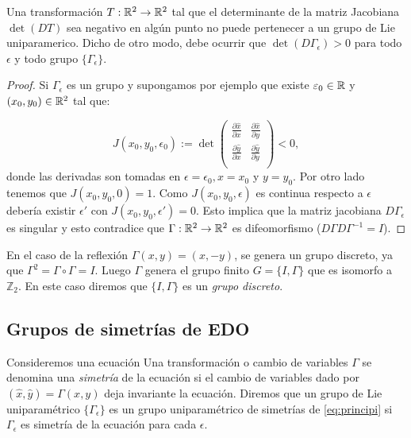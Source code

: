  \begin{teorema}
   Una transformación  $T:\mathbb{R}^2\to\mathbb{R}^2$ tal que el determinante de la matriz Jacobiana $\det(DT)$ sea negativo en algún punto no puede pertenecer a un grupo de Lie uniparamerico. Dicho de otro modo, debe ocurrir que $\det(D\Gamma_{\epsilon})>0$ para todo $\epsilon$ y todo grupo $\{\Gamma_{\epsilon}\}$.
 \end{teorema}
\begin{proof}
 Si $\Gamma_{\epsilon}$ es un grupo y supongamos por ejemplo que existe $\varepsilon_0\in\mathbb{R}$ y $(x_0,y_0)\in\mathbb{R}^2$ tal que:

\[J(x_0,y_0,\epsilon_0):=\det\begin{pmatrix} \frac{\partial\hat{x}}{\partial x}&  \frac{\partial\hat{x}}{\partial y}\\
 \frac{\partial\hat{y}}{\partial x} &  \frac{\partial\hat{y}}{\partial y}\\
\end{pmatrix}<0,
\]
donde las derivadas son tomadas en $\epsilon=\epsilon_0, x=x_0$ y $y=y_0$.
 Por otro lado tenemos que $J(x_0,y_0,0)=1$. Como $J(x_0,y_0,\epsilon)$ es continua respecto a $\epsilon$ debería existir $\epsilon'$ con $J(x_0,y_0,\epsilon')=0$. Esto implica que la matriz jacobiana $D\Gamma_{\epsilon}$ es singular y esto contradice que $\Gamma:\mathbb{R}^2\to \mathbb{R}^2$ es difeomorfismo ($D\Gamma D\Gamma^{-1}=I$).
\end{proof}


 
 
 



 En el caso de la reflexión $\Gamma(x,y)=(x,-y)$, se  genera un grupo discreto, ya que $\Gamma^2=\Gamma\circ \Gamma=I$. Luego $\Gamma$ genera el grupo finito $G=\{I,\Gamma\}$ que es isomorfo a $\mathbb{Z}_2$. En este caso diremos que    $\{I,\Gamma\}$ es un \emph{grupo discreto}.





\subsection{Grupos de simetrías de EDO}
\begin{definicion}
 Consideremos una ecuación
Una transformación o cambio de variables $\Gamma$ se denomina una \emph{simetría} de la ecuación si el cambio de variables dado por $(\hat{x},\hat{y})=\Gamma(x,y)$ deja invariante  la ecuación.  Diremos que un grupo de Lie uniparamétrico $\{\Gamma_{\epsilon}\}$ es un grupo uniparamétrico de simetrías de \eqref{eq:principi} si $\Gamma_{\epsilon}$ es simetría de la ecuación para cada $\epsilon$.

\end{definicion}


